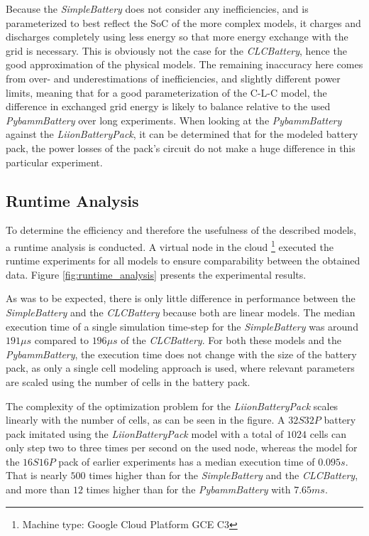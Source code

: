 Because the \textit{SimpleBattery} does not consider any inefficiencies, and is parameterized to best reflect the SoC of the more complex models, it charges and discharges completely using less energy so that more energy exchange with the grid is necessary. This is obviously not the case for the \textit{CLCBattery}, hence the good approximation of the physical models. The remaining inaccuracy here comes from over- and underestimations of inefficiencies, and slightly different power limits, meaning that for a good parameterization of the C-L-C model, the difference in exchanged grid energy is likely to balance relative to the used \textit{PybammBattery} over long experiments. When looking at the \textit{PybammBattery} against the \textit{LiionBatteryPack}, it can be determined that for the modeled battery pack, the power losses of the pack's circuit do not make a huge difference in this particular experiment.

\subsection{Runtime Analysis}
\label{runtime_analysis}
To determine the efficiency and therefore the usefulness of the described models, a runtime analysis is conducted. A virtual node in the cloud \footnote{Machine type: Google Cloud Platform GCE C3} executed the runtime experiments for all models to ensure comparability between the obtained data. Figure \ref{fig:runtime_analysis} presents the experimental results.

As was to be expected, there is only little difference in performance between the \textit{SimpleBattery} and the \textit{CLCBattery} because both are linear models. The median execution time of a single simulation time-step for the \textit{SimpleBattery} was around $191\mu s$ compared to $196\mu s$ of the \textit{CLCBattery}. For both these models and the \textit{PybammBattery}, the execution time does not change with the size of the battery pack, as only a single cell modeling approach is used, where relevant parameters are scaled using the number of cells in the battery pack.

The complexity of the optimization problem for the \textit{LiionBatteryPack} scales linearly with the number of cells, as can be seen in the figure. A $32S32P$ battery pack imitated using the \textit{LiionBatteryPack} model with a total of $1024$ cells can only step two to three times per second on the used node, whereas the model for the $16S16P$ pack of earlier experiments has a median execution time of $0.095s$. That is nearly $500$ times higher than for the \textit{SimpleBattery} and the \textit{CLCBattery}, and more than $12$ times higher than for the \textit{PybammBattery} with $7.65ms$.

